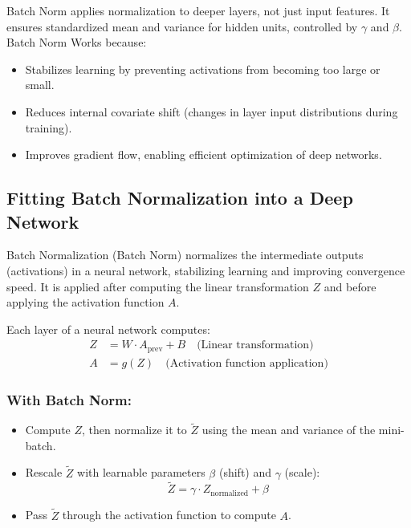 \documentclass[letterpaper,12pt,notitlepage,twoside]{report}
\begin{document}
Batch Norm applies normalization to deeper layers, not just input features. It ensures standardized mean and variance for hidden units, controlled by \(\gamma\) and \(\beta\). Batch Norm Works because:
\begin{itemize}[noitemsep, topsep=0pt]
    \item Stabilizes learning by preventing activations from becoming too large or small.
    \item Reduces internal covariate shift (changes in layer input distributions during training).
    \item Improves gradient flow, enabling efficient optimization of deep networks.
\end{itemize}

\subsection*{Fitting Batch Normalization into a Deep Network}
Batch Normalization (Batch Norm) normalizes the intermediate outputs (activations) in a neural network, stabilizing learning and improving convergence speed. It is applied after computing the linear transformation \( Z \) and before applying the activation function \( A \).

Each layer of a neural network computes:
\begin{align*}
    Z &= W \cdot A_{\text{prev}} + B \quad \text{(Linear transformation)} \\
    A &= g(Z) \quad \text{(Activation function application)}
\end{align*}

\subsubsection{With Batch Norm:}
\begin{itemize}[noitemsep, topsep=0pt]
    \item Compute \( Z \), then normalize it to \( \tilde{Z} \) using the mean and variance of the mini-batch.
    \item Rescale \( \tilde{Z} \) with learnable parameters \( \beta \) (shift) and \( \gamma \) (scale):
    \[
    \tilde{Z} = \gamma \cdot Z_{\text{normalized}} + \beta
    \]
    \item Pass \( \tilde{Z} \) through the activation function to compute \( A \).
\end{itemize}
\end{document}
